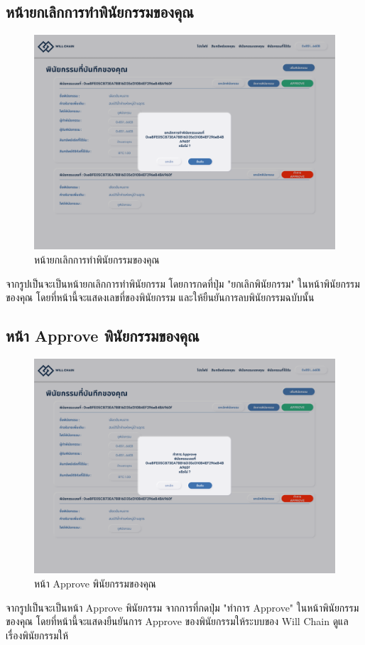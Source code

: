 \documentclass[12pt,oneside,openright,a4paper]{cpe-thai-project}
\begin{document}
\subsection{หน้ายกเลิกการทำพินัยกรรมของคุณ}
		\begin{figure}[!thb]
			\centering
			\includegraphics[scale=0.2]{cancelWill}
			\caption{หน้ายกเลิกการทำพินัยกรรมของคุณ}
		\end{figure}
		\FloatBarrier
		\tab จากรูปเป็นจะเป็นหน้ายกเลิกการทำพินัยกรรม โดยการกดที่ปุ่ม "ยกเลิกพินัยกรรม" ในหน้าพินัยกรรมของคุณ โดยที่หน้านี้จะแสดงเลขที่ของพินัยกรรม และให้ยืนยันการลบพินัยกรรมฉบับนั้น

\subsection{หน้า Approve พินัยกรรมของคุณ}
		\begin{figure}[!thb]
			\centering
			\includegraphics[scale=0.2]{WillApprove}
			\caption{หน้า Approve พินัยกรรมของคุณ}
		\end{figure}
		\FloatBarrier
		\tab จากรูปเป็นจะเป็นหน้า Approve พินัยกรรม จากการที่กดปุ่ม "ทำการ Approve" ในหน้าพินัยกรรมของคุณ โดยที่หน้านี้จะแสดงยืนยันการ Approve ของพินัยกรรมให้ระบบของ Will Chain ดูแลเรื่องพินัยกรรมให้
\end{document}
